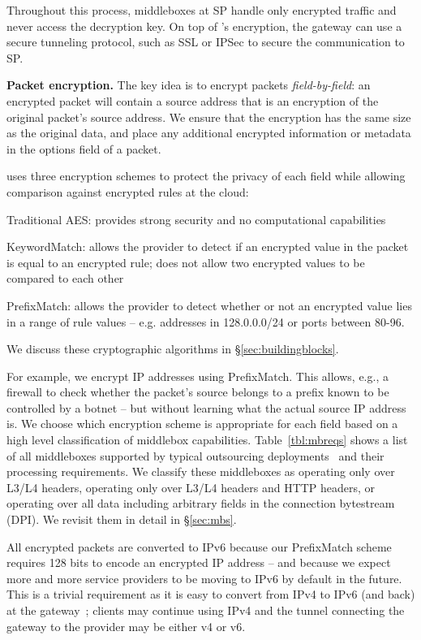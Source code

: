 Throughout this process, middleboxes at SP handle only encrypted traffic and never access the decryption key. 
On top of \sys's encryption, the gateway can use a secure tunneling protocol, such as SSL or IPSec to secure the communication to SP.




\noindent\textbf{Packet encryption.}
The key idea is to encrypt packets {\it field-by-field}: \eg{}  an encrypted packet will contain a source address that is an encryption of the original packet's source address. We ensure that the encryption has the same size as the original data, and place any additional encrypted information or metadata in the options field of a packet. 

\sys uses three encryption schemes to protect the privacy of each field while allowing comparison against encrypted rules at the cloud: 

\begin{myitemize}
\item Traditional AES: provides strong security and no computational capabilities
\item KeywordMatch:  allows the provider to detect if an encrypted value in the packet is equal to an encrypted rule; does not allow two encrypted values to be compared to each other
\item PrefixMatch: allows the provider to detect whether or not an encrypted value lies in a range of rule values -- e.g. addresses in 128.0.0.0/24 or ports between 80-96.
\end{myitemize}
We discuss these cryptographic algorithms in \S\ref{sec:buildingblocks}.

For example, we encrypt IP addresses using PrefixMatch. This allows, e.g., a firewall to check whether the packet's source belongs to a prefix known to be controlled by a botnet -- but without learning what the actual source IP address is.
We choose which encryption scheme is appropriate for each field based on a high level classification of middlebox capabilities.
Table~\ref{tbl:mbreqs} shows a list of all middleboxes supported by typical outsourcing deployments~\cite{aplomb} and their processing requirements.
We classify these middleboxes as operating only over L3/L4 headers, operating only over L3/L4 headers and HTTP headers, or operating over all data including arbitrary fields in the connection bytestream (DPI).
We revisit them in detail in \S\ref{sec:mbs}.

All encrypted packets are converted to IPv6 because our PrefixMatch scheme requires 128 bits to encode an encrypted IP address  -- and because we expect more and more service providers to be moving to IPv6 by default in the future.
This is a trivial requirement as it is easy to convert from IPv4 to IPv6 (and back) at the gateway~\cite{siit}; clients may continue using IPv4 and the tunnel connecting the gateway to the provider may be either v4 or v6.

